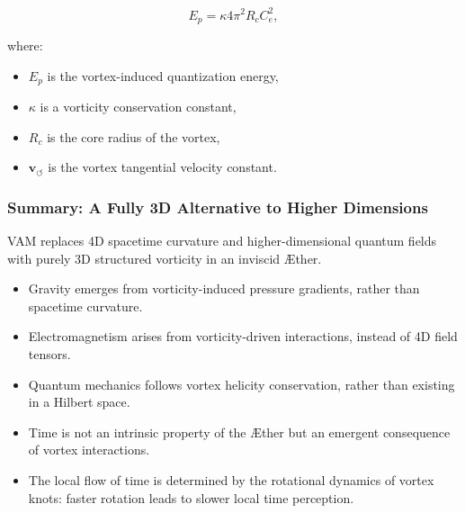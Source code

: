 \documentclass[a4paper,10pt]{article}
\begin{document}
    \begin{equation*}
        E_p = \kappa 4\pi^2 R_c C^2_e,
    \end{equation*}

    where:
    \begin{itemize}
        \item \( E_p \) is the vortex-induced quantization energy,
        \item \( \kappa \) is a vorticity conservation constant,
        \item \( R_c \) is the core radius of the vortex,
        \item \( \mathbf{v}_{\scriptscriptstyle\boldsymbol{\circlearrowleft}} \) is the vortex tangential velocity constant.
    \end{itemize}

    \begin{table}[h]
        \centering
        \caption{Comparison between Standard Quantum Mechanics and VAM}
        \label{tab:QM_vs_VAM}
    \end{table}

    \subsubsection*{Summary: A Fully 3D Alternative to Higher Dimensions}

    VAM replaces 4D spacetime curvature and higher-dimensional quantum fields with purely 3D structured vorticity in an inviscid Æther.

    \begin{itemize}
        \item Gravity emerges from vorticity-induced pressure gradients, rather than spacetime curvature.
        \item Electromagnetism arises from vorticity-driven interactions, instead of 4D field tensors.
        \item Quantum mechanics follows vortex helicity conservation, rather than existing in a Hilbert space.
    \item Time is not an intrinsic property of the Æther but an emergent consequence of vortex interactions.
    \item The local flow of time is determined by the rotational dynamics of vortex knots: faster rotation leads to slower local time perception.
\end{itemize}
\end{document}
